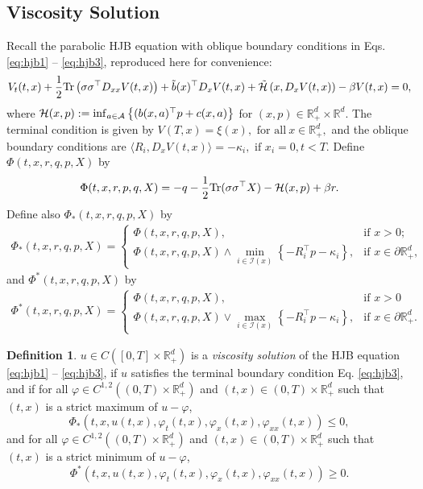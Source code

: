 \documentclass[11pt]{article}
\theoremstyle{definition}
\newtheorem{definition}[assumption]{Definition}
\theoremstyle{plain}
\newcommand{\cH}{{\cal H}}
\newcommand{\tb}{\tilde{b}}
\begin{document}
\subsection{Viscosity Solution}
Recall the parabolic HJB equation with oblique boundary conditions in Eqs. \eqref{eq:hjb1} -- \eqref{eq:hjb3}, reproduced here for convenience:
\begin{equation*}
  V_t(t,x) + \frac{1}{2}\mathrm{Tr}\left(\sigma\sigma^{\top} D_{xx}V(t,x)\right) + \tb(x)^{\top} D_x V(t,x) + \tilde\cH\left(x, D_x V(t,x)\right) - \beta V(t,x) = 0, 
\end{equation*}
where 
\(
\cH(x,p) := \inf_{a \in \mathcal{A}} \left\{ (b(x,a)^{\top} p + c(x,a) \right\} \) for \( (x,p) \in \mathbb{R}^d_+ \times \mathbb{R}^d.
\)
The terminal condition is given by 
\(
V(T,x) = \xi(x), \text{ for all} \ x \in \mathbb{R}^d_+, 
\)
and the oblique boundary conditions are
\(
\langle R_i, D_x V (t,x) \rangle = -\kappa_i, \text{ if } x_i = 0, t<T.
\)
Define $\Phi(t,x,r,q,p,X)$ by
\begin{align}
\Phi(t,x,r,p,q,X) = -q - \frac{1}{2} \mathrm{Tr}(\sigma \sigma^{\top} X) - \cH (x,p) + \beta r.
\end{align}
Define also $\Phi_*(t,x,r,q,p,X)$ by
\begin{align}
\Phi_*(t,x,r,q,p,X) =
\begin{cases}
\Phi(t,x,r,q,p,X), & \text{if } x > 0; \\
\Phi(t,x,r,q,p,X) \wedge \min_{i \in \mathcal{I}(x)} \left\{ - R_i^{\top} p - \kappa_i \right\}, & \text{if } x \in \partial \mathbb{R}_+^d,
\end{cases}
\end{align}
and $\Phi^*(t,x,r,q,p,X)$ by
\begin{align}
\Phi^*(t,x,r,q,p,X) =
\begin{cases}
\Phi(t,x,r,q,p,X), & \text{if } x > 0 \\
\Phi(t,x,r,q,p,X) \vee \max_{i \in \mathcal{I}(x)} \left\{ - R_i^{\top} p - \kappa_i \right\}, & \text{if } x \in \partial \mathbb{R}_+^d.
\end{cases}
\end{align}
\begin{definition}
$u \in C([0,T] \times \mathbb{R}_+^d)$ is a {\em viscosity solution} of the HJB equation \eqref{eq:hjb1} -- \eqref{eq:hjb3}, 
if $u$ satisfies the terminal boundary condition Eq. \eqref{eq:hjb3}, and 
if for all $\varphi \in C^{1,2}((0,T) \times \mathbb{R}_+^d)$ and $(t,x) \in (0,T) \times \mathbb{R}_+^d$ such that $(t,x)$ is a strict maximum of $u - \varphi$,
\begin{equation}\label{eq:supersolution}
\Phi_*(t,x,u(t,x), \varphi_t(t,x), \varphi_x(t,x), \varphi_{xx}(t,x)) \leq 0,
\end{equation}
and for all $\varphi \in C^{1,2}((0,T) \times \mathbb{R}_+^d)$ and
$(t,x) \in (0,T) \times \mathbb{R}_+^d$ such that $(t,x)$ is a strict minimum of $u - \varphi$, 
\begin{equation}\label{eq:subsolution}
\Phi^*(t,x,u(t,x), \varphi_t(t,x), \varphi_x(t,x), \varphi_{xx}(t,x)) \geq 0.
\end{equation}
\end{definition}
\end{document}
